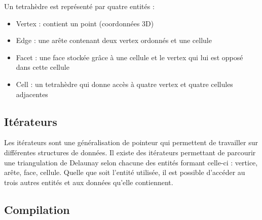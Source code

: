 Un tetrahèdre est représenté par quatre entités :
\begin{itemize}
  \item Vertex : contient un point (coordonnées 3D)
  \item Edge : une arête contenant deux vertex ordonnés et une cellule
  \item Facet : une face stockée grâce à une cellule et le vertex qui lui est opposé dans cette cellule
  \item Cell : un tetrahèdre qui donne accès à quatre vertex et quatre cellules adjacentes
\end{itemize}









\subsection{Itérateurs}

Les itérateurs sont une généralisation de pointeur qui permettent de travailler sur
différentes structures de données.
Il existe des itérateurs permettant de parcourir une triangulation de Delaunay
selon chacune des entités formant celle-ci : vertice, arête, face, cellule. Quelle
que soit l'entité utilisée, il est possible d'accéder au trois autres entités et
aux données qu'elle contiennent.

\subsection{Compilation}
